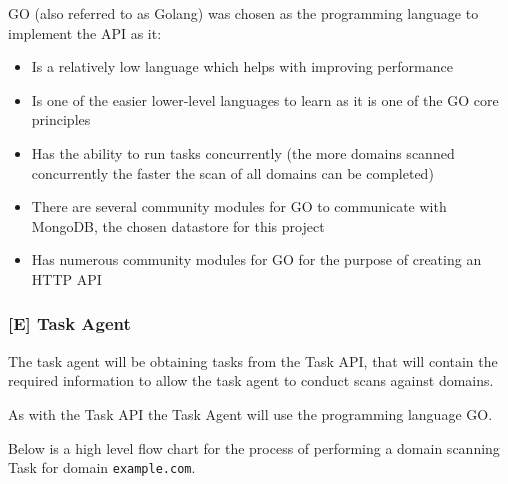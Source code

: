 \documentclass{mscreport}
\begin{document}
\vspace{0.6cm} \noindent
GO (also referred to as Golang) was chosen as the programming language to implement the API as it:
\begin{itemize}
	\setlength\itemsep{0.1em}
    \item Is a relatively low language which helps with improving performance
    \item Is one of the easier lower-level languages to learn as it is one of the GO core principles
    \item Has the ability to run tasks concurrently (the more domains scanned concurrently the faster the scan of all domains can be completed)
    \item There are several community modules for GO to communicate with MongoDB, the chosen datastore for this project
    \item Has numerous community modules for GO for the purpose of creating an HTTP API
\end{itemize}

\subsubsection{[E] Task Agent}

The task agent will be obtaining tasks from the Task API, that will contain the required information to allow the task agent to conduct scans against domains.

\vspace{0.3cm} \noindent
As with the Task API the Task Agent will use the programming language GO.

\vspace{0.3cm} \noindent
Below is a high level flow chart for the process of performing a domain scanning Task for domain  \texttt{example.com}.
\end{document}
